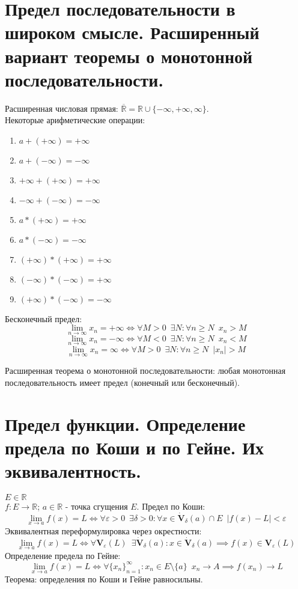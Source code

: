 \documentclass[11pt, a4paper]{article}
\def\R{\mathbb{R}}
\def\sp{\, \, \,}
\def\linf{\lim \limits_{n \to \infty}}
\def\lima{\lim \limits_{x \to a}}
\begin{document}
    \section{Предел последовательности в широком смысле. Расширенный вариант теоремы о монотонной последовательности.}
    Расширенная числовая прямая: $\overline{\R} = \R \cup \{-\infty, +\infty, \infty\}$.\\
    Некоторые арифметические операции:
    \begin{enumerate}
        \item $a + (+\infty) = +\infty$
        \item $a + (-\infty) = -\infty$
        \item $+\infty + (+\infty) = +\infty$
        \item $-\infty + (-\infty) = -\infty$
        \item $a * (+\infty) = +\infty$
        \item $a * (-\infty) = -\infty$
        \item $(+\infty)*(+\infty) = +\infty$
        \item $(-\infty)*(-\infty) = +\infty$
        \item $(+\infty)*(-\infty) = -\infty$
    \end{enumerate}

    Бесконечный предел:
    $$\linf x_n = +\infty \iff \forall M > 0 \sp \exists N: \forall n \geq N \sp x_n > M$$
    $$\linf x_n = -\infty \iff \forall M < 0 \sp \exists N: \forall n \geq N \sp x_n < M$$
    $$\linf x_n = \infty \iff \forall M > 0 \sp \exists N: \forall n \geq N \sp |x_n| > M$$

    Расширенная теорема о монотонной последовательности: любая монотонная последовательность имеет предел (конечный или бесконечный).

    \section{Предел функции. Определение предела по Коши и по Гейне. Их эквивалентность.}
    $E \in \R$\\
    $f: E \to \R$; $a \in \R$ - точка сгущения $E$. Предел по Коши:
    $$\lima f(x) = L \iff \forall \varepsilon > 0 \sp \exists \delta > 0 : \forall x \in \dot{\mathbf{V}}_{\delta}(a) \cap E \sp |f(x) - L| < \varepsilon$$
    Эквивалентная переформулировка через окрестности:
    $$\lima f(x) = L \iff \forall \mathbf{V}_{\varepsilon}(L) \sp \exists \dot{\mathbf{V}}_{\delta}(a) : x \in \dot{\mathbf{V}}_{\delta}(a) \implies f(x) \in \mathbf{V}_{\varepsilon}(L)$$
    Определение предела по Гейне:
    $$\lima f(x) = L \iff \forall \{x_n\}_{n = 1}^{\infty}: x_n \in E \setminus \{a\} \sp x_n \to A \implies f(x_n) \to L$$
    Теорема: определения по Коши и Гейне равносильны.
    
\end{document}
